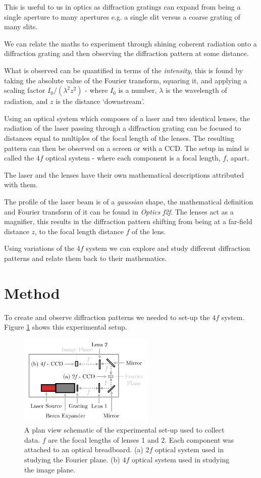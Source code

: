 \documentclass[twocolumn]{revtex4}
\begin{document}
This is useful to us in optics as diffraction gratings can expand from being a single aperture to many apertures e.g. a single slit versus a coarse grating of many slits.

We can relate the maths to experiment through shining coherent radiation onto a diffraction grating and then observing the diffraction pattern at some distance. 

What is observed can be quantified in terms of the \textit{intensity}, this is found by taking the absolute value of the Fourier transform, squaring it, and applying a scaling factor $I_0/(\lambda^2z^2)$ - where $I_0$ is a number, $\lambda$ is the wavelength of radiation, and $z$ is the distance `downstream'.

Using an optical system which composes of a laser and two identical lenses, the radiation of the laser passing through a diffraction grating can be focused to distances equal to multiples of the focal length of the lenses. The resulting pattern can then be observed on a screen or with a CCD. The setup in mind is called the $4f$ optical system - where each component is a focal length, $f$, apart.

The laser and the lenses have their own mathematical descriptions attributed with them.

The profile of the laser beam is of a \textit{gaussian} shape, the mathematical definition and Fourier transform of it can be found in \textit{Optics f2f}. The lenses act as a magnifier, this results in the diffraction pattern shifting from being at a far-field distance $z$, to the focal length distance $f$ of the lens.

Using variations of the $4f$ system we can explore and study different diffraction patterns and relate them back to their mathematics.

\vspace{-3ex}
\section{Method} 
\vspace{-2ex}
To create and observe diffraction patterns we needed to set-up the $4f$ system. Figure \ref{m-fig1} shows this experimental setup.
\begin{figure}[!h]
\begin{center}
\includegraphics[width=6.5cm]{method/fig1-1}
\caption[]{A plan view schematic of the experimental set-up used to collect data. $f$ are the focal lengths of lenses 1 and 2. Each component was attached to an optical breadboard. (a) $2f$ optical system used in studying the Fourier plane. (b) $4f$ optical system used in studying the image plane.}
\label{m-fig1}
\end{center}
\end{figure}
\end{document}
